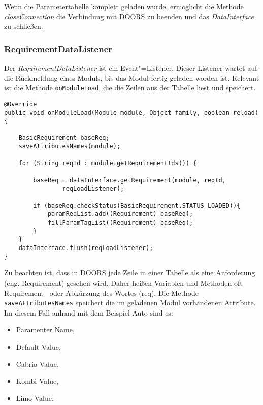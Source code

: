 Wenn die Parametertabelle komplett geladen wurde, ermöglicht die Methode \textit{closeConnection} die Verbindung mit DOORS zu beenden und das \textit{DataInterface} zu schließen.





\subsubsection{RequirementDataListener}\label{sub.RequirementDataListener}

Der \textit{RequirementDataListener} ist ein Event"=Listener. Dieser Listener wartet auf die Rückmeldung eines Moduls, bis das Modul fertig geladen worden ist. Relevant ist die Methode \texttt{onModuleLoad}, die die Zeilen aus der Tabelle liest und speichert.\\

\begin{lstlisting}[caption={Laden der Parametertabelle nach Zeilen}, captionpos=b]
@Override
public void onModuleLoad(Module module, Object family, boolean reload){

	BasicRequirement baseReq;
	saveAttributesNames(module);
				
	for (String reqId : module.getRequirementIds()) {

		baseReq = dataInterface.getRequirement(module, reqId,
				reqLoadListener);

		if (baseReq.checkStatus(BasicRequirement.STATUS_LOADED)){
			paramReqList.add((Requirement) baseReq);
			fillParamTagList((Requirement) baseReq);
		}
	}
	dataInterface.flush(reqLoadListener);
}
\end{lstlisting}

Zu beachten ist, dass in DOORS jede Zeile in einer Tabelle als eine Anforderung (eng. Requirement) gesehen wird. Daher heißen Variablen und Methoden oft \glqq Requirement\grqq~ oder Abkürzung des Wortes (req). Die Methode \texttt{saveAttributesNames} speichert die im geladenen Modul vorhandenen Attribute. Im diesem Fall anhand mit dem Beispiel Auto sind es:

\begin{itemize}\itemsep1pt
\item Paramenter Name,
\item Default Value,
\item Cabrio Value,
\item Kombi Value,
\item Limo Value.
\end{itemize}

